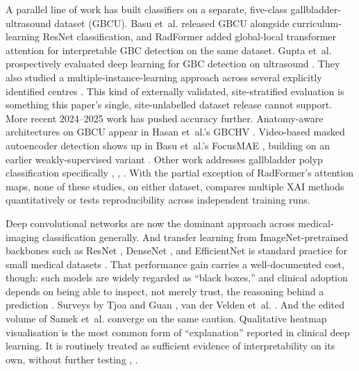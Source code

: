 A parallel line of work has built classifiers on a separate, five-class gallbladder-ultrasound dataset (GBCU). Basu et~al. \cite{ref7} released GBCU alongside curriculum-learning ResNet classification, and RadFormer \cite{ref19} added global-local transformer attention for interpretable GBC detection on the same dataset. Gupta et~al. prospectively evaluated deep learning for GBC detection on ultrasound \cite{ref20}. They also studied a multiple-instance-learning approach across several explicitly identified centres \cite{ref21}. This kind of externally validated, site-stratified evaluation is something this paper's single, site-unlabelled dataset release cannot support. More recent 2024--2025 work has pushed accuracy further. Anatomy-aware architectures on GBCU appear in Hasan et~al.'s GBCHV \cite{ref22}. Video-based masked autoencoder detection shows up in Basu et~al.'s FocusMAE \cite{ref23}, building on an earlier weakly-supervised variant \cite{ref24}. Other work addresses gallbladder polyp classification specifically \cite{ref16}, \cite{ref25}, \cite{ref26}. With the partial exception of RadFormer's attention maps, none of these studies, on either dataset, compares multiple XAI methods quantitatively or tests reproducibility across independent training runs.

Deep convolutional networks are now the dominant approach across medical-imaging classification generally. And transfer learning from ImageNet-pretrained backbones such as ResNet \cite{ref27}, DenseNet \cite{ref28}, and EfficientNet \cite{ref29} is standard practice for small medical datasets \cite{ref30}. That performance gain carries a well-documented cost, though: such models are widely regarded as ``black boxes,'' and clinical adoption depends on being able to inspect, not merely trust, the reasoning behind a prediction \cite{ref8}. Surveys by Tjoa and Guan \cite{ref31}, van der Velden et~al. \cite{ref10}. And the edited volume of Samek et~al. \cite{ref32} converge on the same caution. Qualitative heatmap visualisation is the most common form of ``explanation'' reported in clinical deep learning. It is routinely treated as sufficient evidence of interpretability on its own, without further testing \cite{ref8}, \cite{ref9}.

